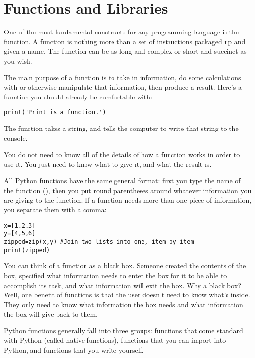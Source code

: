 \chapter{Functions and Libraries}
\label{chap:Functions}

One of the most fundamental constructs for any programming language is
the function. A function is nothing more than a set of instructions
packaged up and given a name.  The function can be as long and complex
or short and succinct as you wish.

The main purpose of a function is to take in information, do some calculations with or otherwise manipulate that information, then produce a result.  Here's a function you should already be comfortable with:
\begin{Verbatim}
print('Print is a function.')
\end{Verbatim}
The  function takes a string, and tells the computer to write that string to the console.

You do not need to know all of the details of how a function works in order to use it.  You just need to know what to give it, and what the result is.

All Python functions have the same general format: first you type the name of the function (), then you put round parentheses \code{()} around whatever information you are giving to the function.  If a function needs more than one piece of information, you separate them with a comma:
\begin{Verbatim}
x=[1,2,3]
y=[4,5,6]
zipped=zip(x,y) #Join two lists into one, item by item
print(zipped)
\end{Verbatim}

You can think of a function as a
black box. Someone created the contents of the box, specified what
information needs to enter the box for it to be able to accomplish
its task, and what information will exit the box.  Why a black box?
Well, one benefit of functions is that the user doesn't need to
know what's inside.  They only need to know what information the box
needs and what information the box will give back to them.

Python functions generally fall into three groups: functions that come standard with Python (called native functions), functions that you can import into Python, and functions that you write yourself.

